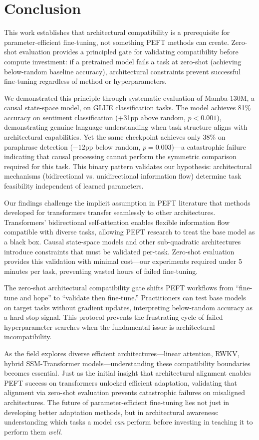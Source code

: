 \section{Conclusion}

This work establishes that architectural compatibility is a prerequisite for parameter-efficient fine-tuning, not something PEFT methods can create. Zero-shot evaluation provides a principled gate for validating compatibility before compute investment: if a pretrained model fails a task at zero-shot (achieving below-random baseline accuracy), architectural constraints prevent successful fine-tuning regardless of method or hyperparameters.

We demonstrated this principle through systematic evaluation of Mamba-130M, a causal state-space model, on GLUE classification tasks. The model achieves 81\% accuracy on sentiment classification (+31pp above random, $p<0.001$), demonstrating genuine language understanding when task structure aligns with architectural capabilities. Yet the same checkpoint achieves only 38\% on paraphrase detection ($-12$pp below random, $p=0.003$)---a catastrophic failure indicating that causal processing cannot perform the symmetric comparison required for this task. This binary pattern validates our hypothesis: architectural mechanisms (bidirectional vs. unidirectional information flow) determine task feasibility independent of learned parameters.

Our findings challenge the implicit assumption in PEFT literature that methods developed for transformers transfer seamlessly to other architectures. Transformers' bidirectional self-attention enables flexible information flow compatible with diverse tasks, allowing PEFT research to treat the base model as a black box. Causal state-space models and other sub-quadratic architectures introduce constraints that must be validated per-task. Zero-shot evaluation provides this validation with minimal cost---our experiments required under 5 minutes per task, preventing wasted hours of failed fine-tuning.

The zero-shot architectural compatibility gate shifts PEFT workflows from ``fine-tune and hope'' to ``validate then fine-tune.'' Practitioners can test base models on target tasks without gradient updates, interpreting below-random accuracy as a hard stop signal. This protocol prevents the frustrating cycle of failed hyperparameter searches when the fundamental issue is architectural incompatibility.

As the field explores diverse efficient architectures---linear attention, RWKV, hybrid SSM-Transformer models---understanding these compatibility boundaries becomes essential. Just as the initial insight that architectural alignment enables PEFT success on transformers unlocked efficient adaptation, validating that alignment via zero-shot evaluation prevents catastrophic failures on misaligned architectures. The future of parameter-efficient fine-tuning lies not just in developing better adaptation methods, but in architectural awareness: understanding which tasks a model \textit{can} perform before investing in teaching it to perform them \textit{well}.

